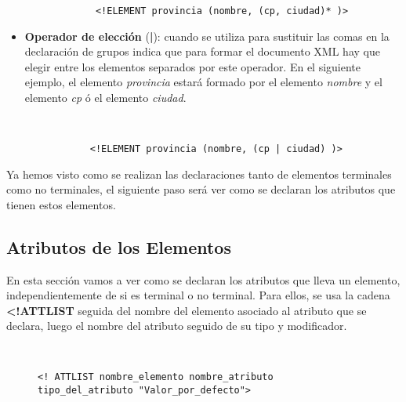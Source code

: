 \begin{itemize}
\begin{figure}[H]
\begin{tcolorbox}[sharp corners, colback=yellow!30, colframe=white!20]
\begin{verbatim}
       <!ELEMENT provincia (nombre, (cp, ciudad)* )>
            \end{verbatim}
        \end{tcolorbox}
    \end{figure}

    \item \textbf{Operador de elección} (\textbf{|}): cuando se utiliza para sustituir las comas en la declaración de grupos indica que para formar el documento XML hay que elegir entre los elementos separados por este operador. En el siguiente ejemplo, el elemento \textit{provincia} estará formado por el elemento \textit{nombre} y el elemento \textit{cp} ó el elemento \textit{ciudad}.

    \begin{figure}[H]
        \begin{tcolorbox}[sharp corners, colback=yellow!30, colframe=white!20]
            \scriptsize
            \begin{verbatim}


      <!ELEMENT provincia (nombre, (cp | ciudad) )>
            \end{verbatim}
        \end{tcolorbox}
    \end{figure}
\end{itemize}

Ya hemos visto como se realizan las declaraciones tanto de elementos terminales como no terminales, el siguiente paso será ver como se declaran los atributos que tienen estos elementos.

\subsection{Atributos de los Elementos}
En esta sección vamos a ver como se declaran los atributos que lleva un elemento, independientemente de si es terminal o no terminal. Para ellos, se usa la cadena \textbf{<!ATTLIST} seguida del nombre del elemento asociado al atributo que se declara, luego el nombre del atributo seguido de su tipo y modificador.

    \begin{figure}[H]
    \begin{tcolorbox}[sharp corners, colback=yellow!30, colframe=white!20]
        \scriptsize
        \begin{verbatim}


<! ATTLIST nombre_elemento nombre_atributo tipo_del_atributo "Valor_por_defecto">
        \end{verbatim}
    \end{tcolorbox}
\end{figure}

